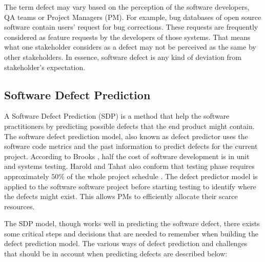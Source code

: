 \documentclass[12pt]{report}
\begin{document}
The term defect may vary based on the perception of the software developers, QA teams or Project Managers (PM). For example, bug databases of open source software contain users' request for bug corrections. These requests are frequently considered as feature requests by the developers of those systems. That means what one stakeholder considers as a defect may not be perceived as the same by other stakeholders. In essence, software defect is any kind of deviation from stakeholder's expectation.

\subsection{Software Defect Prediction}
\label{defination_defect_Predictors}
A Software Defect Prediction (SDP) is a method that help the software practitioners by predicting possible defects that the end product might contain. The software defect prediction model, also known as defect predictor uses the software code metrics and the past information to predict defects for the current project. According to Brooks \cite{brooks1995mythical}, half the cost of software development is in unit and systems testing. Harold and Tahat also conform that testing phase requires approximately $50\%$ of the whole project schedule \cite{harrold2000testing,tahat2001requirement}. The defect predictor model is applied to the software software project before starting testing to identify where the defects might exist. This allows PMs to efficiently allocate their scarce resources. 

The SDP model, though works well in predicting the software defect, there exists some critical steps and decisions that are needed to remember when building the defect prediction model. The various ways of defect prediction and challenges that should be in account when predicting defects are described below:
\end{document}
